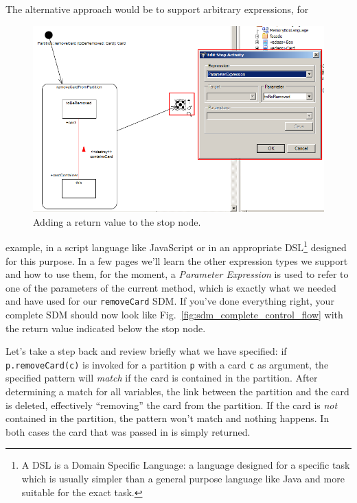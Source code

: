 The alternative approach would be to
support arbitrary expressions, for\clearpage
\begin{figure}[htp]
\begin{center}
  \includegraphics[width=\textwidth]{pics/sdmBilder/removeCard/sdm14RAW}
  \caption{Adding a return value to the stop node.}  
  \label{fig:stop_node_return_value}
\end{center}
\end{figure}
example, in a script language like
JavaScript or in an appropriate DSL\footnote{A DSL is a Domain Specific
Language: a language designed for a specific task which is usually simpler
than a general purpose language like Java and more suitable for the exact task.}
designed for this purpose. In a few pages we'll learn the other expression types
we support and how to use them, for the moment, a \emph{Parameter Expression} is
used to refer to one of the parameters of the current method, which is exactly
what we needed and have used for our \texttt{removeCard} SDM.
If you've done everything right, your complete SDM should now look like
Fig.~\ref{fig:sdm_complete_control_flow} with the return value indicated below
the stop node.

Let's take a step back and review briefly what we have specified:  if
\texttt{p.remove\-Card(c)} is invoked for a partition \texttt{p} with a card
\texttt{c} as argument, the specified pattern will \emph{match} if the card is
contained in the partition.  After determining a match for all variables, the
link between the partition and the card is deleted, effectively ``removing'' the
card from the partition.  If the card is \emph{not} contained in the partition,
the pattern won't match and nothing happens. In both cases the card that was
passed in is simply returned.

